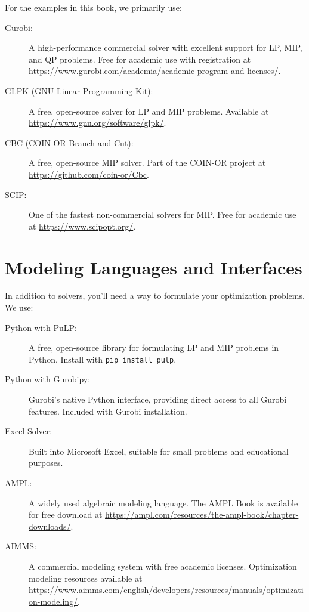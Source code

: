 For the examples in this book, we primarily use:

\begin{description}
\item[Gurobi:] A high-performance commercial solver with excellent support for LP, MIP, and QP problems. Free for academic use with registration at \url{https://www.gurobi.com/academia/academic-program-and-licenses/}.

\item[GLPK (GNU Linear Programming Kit):] A free, open-source solver for LP and MIP problems. Available at \url{https://www.gnu.org/software/glpk/}.

\item[CBC (COIN-OR Branch and Cut):] A free, open-source MIP solver. Part of the COIN-OR project at \url{https://github.com/coin-or/Cbc}.

\item[SCIP:] One of the fastest non-commercial solvers for MIP. Free for academic use at \url{https://www.scipopt.org/}.
\end{description}

\section{Modeling Languages and Interfaces}

In addition to solvers, you'll need a way to formulate your optimization problems. We use:

\begin{description}
\item[Python with PuLP:] A free, open-source library for formulating LP and MIP problems in Python. Install with \texttt{pip install pulp}.

\item[Python with Gurobipy:] Gurobi's native Python interface, providing direct access to all Gurobi features. Included with Gurobi installation.

\item[Excel Solver:] Built into Microsoft Excel, suitable for small problems and educational purposes.

\item[AMPL:] A widely used algebraic modeling language. The AMPL Book is available for free download at \url{https://ampl.com/resources/the-ampl-book/chapter-downloads/}.

\item[AIMMS:] A commercial modeling system with free academic licenses. Optimization modeling resources available at \url{https://www.aimms.com/english/developers/resources/manuals/optimization-modeling/}.
\end{description}

